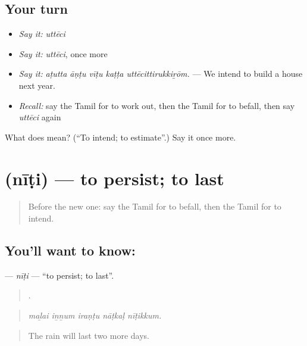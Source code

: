 \subsection*{Your turn}
\begin{itemize}
\raggedright
  \item \emph{Say it:} \emph{uttēci}
  \item \emph{Say it:} \emph{uttēci}, once more
  \item \emph{Say it:} \emph{aṭutta āṇṭu vīṭu kaṭṭa uttēcittirukkiṟōm.} — We intend to build a house next year.
  \item \emph{Recall:} say the Tamil for to work out, then the Tamil for to befall, then say \emph{uttēci} again
\end{itemize}

\begin{tcolorbox}[breakable,colback=teal!4,colframe=teal!35!black,title={Before you move on}]
What does  mean? (\textquotedblleft{}To intend; to estimate\textquotedblright{}.) Say it once more.
\end{tcolorbox}
\section[\texorpdfstring{\ta{நீடி} (nīṭi)}{நீடி (nīṭi)}]{ (nīṭi) — to persist; to last}

\label{lesson:TA-C547-niti}



\begin{quote}
Before the new one: say the Tamil for to befall, then the Tamil for to intend.
\end{quote}

\subsection*{You'll want to know: }
\textbf{} — \emph{nīṭi} — \textquotedblleft{}to persist; to last\textquotedblright{}.

\begin{quote}
    .
\end{quote}

\begin{quote}
\emph{maḻai iṉṉum iraṇṭu nāṭkaḷ nīṭikkum.}
\end{quote}

\begin{quote}
The rain will last two more days.
\end{quote}


